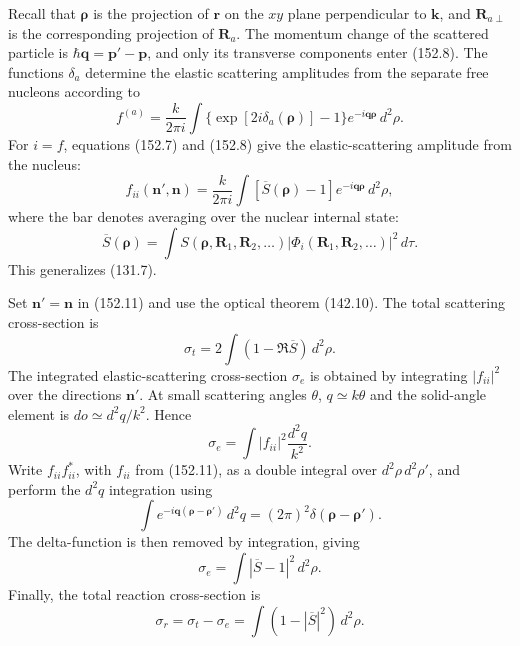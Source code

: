 Recall that $\boldsymbol\rho$ is the projection of $\mathbf r$ on the $xy$ plane perpendicular to $\mathbf k$, and $\mathbf R_{a\perp}$ is the corresponding projection of $\mathbf R_a$. The momentum change of the scattered particle is $\hbar\mathbf q=\mathbf p'-\mathbf p$, and only its transverse components enter (152.8). The functions $\delta_a$ determine the elastic scattering amplitudes from the separate free nucleons according to
\begin{equation}
 f^{(a)}=\frac{k}{2\pi i}\int\{\exp[2i\delta_a(\boldsymbol\rho)]-1\}e^{-i\mathbf q\boldsymbol\rho}\,d^2\rho.
 \tag{152.10}
\end{equation}
For $i=f$, equations (152.7) and (152.8) give the elastic-scattering amplitude from the nucleus:
\begin{equation}
 f_{ii}(\mathbf n',\mathbf n)=\frac{k}{2\pi i}\int[\overline S(\boldsymbol\rho)-1]e^{-i\mathbf q\boldsymbol\rho}\,d^2\rho,
 \tag{152.11}
\end{equation}
where the bar denotes averaging over the nuclear internal state:
\begin{equation}
 \overline S(\boldsymbol\rho)=\int S(\boldsymbol\rho,\mathbf R_1,\mathbf R_2,\ldots)|\Phi_i(\mathbf R_1,\mathbf R_2,\ldots)|^2\,d\tau.
 \tag{152.12}
\end{equation}
This generalizes (131.7).

Set $\mathbf n'=\mathbf n$ in (152.11) and use the optical theorem (142.10). The total scattering cross-section is
\begin{equation}
 \sigma_t=2\int(1-\Re\overline S)\,d^2\rho.
 \tag{152.13}
\end{equation}
The integrated elastic-scattering cross-section $\sigma_e$ is obtained by integrating $|f_{ii}|^2$ over the directions $\mathbf n'$. At small scattering angles $\theta$, $q\simeq k\theta$ and the solid-angle element is $d\mathit{o}\simeq d^2q/k^2$. Hence
\[
 \sigma_e=\int|f_{ii}|^2\frac{d^2q}{k^2}.
\]
Write $f_{ii}f_{ii}^*$, with $f_{ii}$ from (152.11), as a double integral over $d^2\rho\,d^2\rho'$, and perform the $d^2q$ integration using
\[
 \int e^{-i\mathbf q(\boldsymbol\rho-\boldsymbol\rho')}\,d^2q=(2\pi)^2\delta(\boldsymbol\rho-\boldsymbol\rho').
\]
The delta-function is then removed by integration, giving
\begin{equation}
 \sigma_e=\int|\overline S-1|^2\,d^2\rho.
 \tag{152.14}
\end{equation}
Finally, the total reaction cross-section is
\begin{equation}
 \sigma_r=\sigma_t-\sigma_e=\int(1-|\overline S|^2)\,d^2\rho.
 \tag{152.15}
\end{equation}

